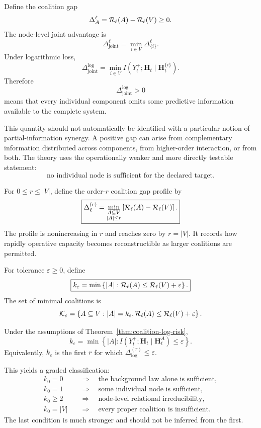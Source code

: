
Define the coalition gap
\[
\Delta_A^{\ell}
=
\mathcal R_\ell(A)-\mathcal R_\ell(V)
\geq0.
\]
The node-level joint advantage is
\[
\boxed{
\Delta_{\mathrm{joint}}^{\ell}
=
\min_{i\in V}
\Delta_{\{i\}}^{\ell}.
}
\]
Under logarithmic loss,
\[
\boxed{
\Delta_{\mathrm{joint}}^{\log}
=
\min_{i\in V}
I\!\left(
Y_t^+;\mathbf H_t
\mid
\mathbf H_t^{\{i\}}
\right).
}
\]
Therefore
\[
\Delta_{\mathrm{joint}}^{\log}>0
\]
means that every individual component omits some predictive information
available to the complete system.

This quantity should not automatically be identified with a particular notion
of partial-information synergy. A positive gap can arise from complementary
information distributed across components, from higher-order interaction, or
from both. The theory uses the operationally weaker and more directly
testable statement:
\[
\text{no individual node is sufficient for the declared target.}
\]

For \(0\leq r\leq |V|\), define the order-\(r\) coalition gap profile by
\[
\boxed{
\Delta^{(r)}_\ell
=
\min_{\substack{A\subseteq V\\|A|\leq r}}
\left[
\mathcal R_\ell(A)-\mathcal R_\ell(V)
\right].
}
\]
The profile is nonincreasing in \(r\) and reaches zero by \(r=|V|\).
It records how rapidly operative capacity becomes reconstructible as larger
coalitions are permitted.


For tolerance \(\varepsilon\geq0\), define
\[
\boxed{
k_\varepsilon
=
\min\left\{
|A|:
\mathcal R_\ell(A)
\leq
\mathcal R_\ell(V)+\varepsilon
\right\}.
}
\]
The set of minimal coalitions is
\[
\mathcal K_\varepsilon
=
\left\{
A\subseteq V:
|A|=k_\varepsilon,
\mathcal R_\ell(A)
\leq
\mathcal R_\ell(V)+\varepsilon
\right\}.
\]

\begin{corollary}
Under the assumptions of Theorem~\ref{thm:coalition-log-risk},
\[
\boxed{
k_\varepsilon
=
\min\left\{
|A|:
I(Y_t^+;\mathbf H_t\mid\mathbf H_t^A)
\leq\varepsilon
\right\}.
}
\]
Equivalently, \(k_\varepsilon\) is the first \(r\) for which
\(\Delta_{\log}^{(r)}\leq\varepsilon\).
\end{corollary}

This yields a graded classification:
\[
\begin{aligned}
k_0=0
&\quad\Longrightarrow\quad
\text{the background law alone is sufficient},\\
k_0=1
&\quad\Longrightarrow\quad
\text{some individual node is sufficient},\\
k_0\geq2
&\quad\Longrightarrow\quad
\text{node-level relational irreducibility},\\
k_0=|V|
&\quad\Longrightarrow\quad
\text{every proper coalition is insufficient}.
\end{aligned}
\]
The last condition is much stronger and should not be inferred from the first.

